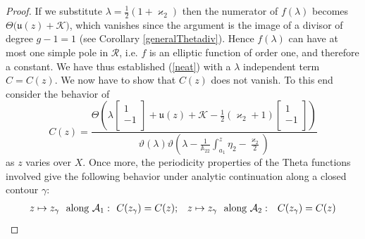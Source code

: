 \documentclass[10pt,oneside,reqno]{amsart}
\numberwithin{equation}{section}
\def\eqref#1{(\ref{#1})}
\begin{document}
\begin{proof}
%
If we substitute $\lambda=\frac{1}{2}(1+\varkappa_2)$ then the numerator of $f(\lambda)$ 
becomes $ \Theta\big(\mathfrak{u}(z)+\mathcal{K}\big)$,
which vanishes since the argument  is the image of a divisor of degree $g-1=1$ (see Corollary \ref{generalThetadiv}). Hence $f(\lambda)$ can have at most one simple pole in $\mathcal{R}$, i.e.
$f$ is an elliptic function of order one, and therefore a constant. We have thus established \eqref{neat} with a $\lambda$ independent term $C=C(z)$. We now have to show that
$C(z)$ does not vanish. To this end consider the behavior of
\begin{equation*}
 C(z)=\frac{\Theta\left(\lambda\begin{bmatrix}
                                                       1\\
-1\\
                                                      \end{bmatrix}+\mathfrak{u}(z)+\mathcal{K}-\frac{1}{2}(\varkappa_2+1)\begin{bmatrix}
                                                                                                                           1\\
-1\\
                                                                                                                          \end{bmatrix}\right)}
{\vartheta(\lambda)\vartheta\left(\lambda-\frac{1}{\mathbb{A}_{22}}\int_{a_1}^{z}\eta_2-\frac{\varkappa_2}{2}\right)}
\end{equation*}
as $z$ varies over $X$. Once more, the periodicity properties of the Theta functions involved give the following behavior under analytic continuation along a closed contour $\gamma$:
\begin{align*}
 z\mapsto z_{\gamma}\ \ \textnormal{along}\ \mathcal{A}_1:\ \ & C(z_{\gamma})=C(z);&& z\mapsto z_{\gamma}\ \ \textnormal{along}\ \mathcal{A}_2: && C(z_{\gamma}) = C(z)\\

\end{align*}
\end{proof}
\end{document}

